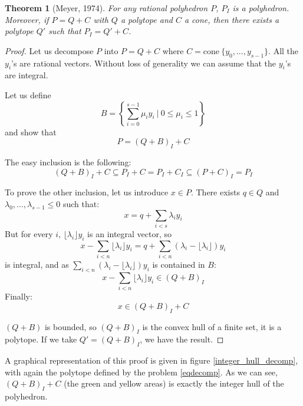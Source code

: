 \documentclass{article}
\newcommand{\cone}{\mathrm{cone}}
\newtheorem{theorem}{Theorem}
\begin{document}
\begin{theorem}[Meyer, 1974]
\label{meyer theorem}
  For any rational polyhedron $P$, $P_I$ is a polyhedron. Moreover, if
  $P = Q + C$ with $Q$ a polytope and $C$ a cone, then there exists a polytope
  $Q'$ such that $P_I = Q' + C$.
\end{theorem}
\begin{proof}
  Let us decompose $P$ into $P = Q + C$ where
  $C = \cone~\{y_0, ..., y_{s-1}\}$. All the $y_i$'s are rational vectors.
  Without loss of generality we can assume that the $y_i$'s are integral.

  Let us define
  $$B = \left\{\sum_{i=0}^{s-1} \mu_i y_i~|~
               0 \leqslant \mu_i \leqslant 1\right\}$$
  and show that $$P = (Q + B)_I + C$$

  The easy inclusion is the following:
  $$(Q + B)_I + C \subseteq P_I + C = P_I + C_I \subseteq (P + C)_I = P_I$$

  To prove the other inclusion, let us introduce $x \in P$.
  There exists $q \in Q$ and $\lambda_0, ..., \lambda_{s-1}
  \leqslant 0$ such that: $$x = q + \sum_{i < s} \lambda_i y_i$$ But for every
  $i$, $\lfloor \lambda_i \rfloor y_i$ is an integral vector, so
  $$x - \sum_{i<n} \lfloor \lambda_i \rfloor y_i=
      q + \sum_{i<n} (\lambda_i - \lfloor \lambda_i \rfloor) y_i$$
  is integral, and as $\sum_{i<n} (\lambda_i - \lfloor \lambda_i \rfloor) y_i$
  is contained in $B$:
  $$x - \sum_{i<n} \lfloor \lambda_i \rfloor y_i \in (Q + B)_I$$
  Finally: $$x \in (Q + B)_I + C$$

  $(Q + B)$ is bounded, so $(Q + B)_I$ is the convex hull of a finite set, it is
  a polytope. If we take $Q' = (Q + B)_I$, we have the result.
\end{proof}

A graphical representation of this proof is given in figure
\ref{integer_hull_decomp}, with again the polytope defined by the problem
\ref{eqdecomp}. As we can see, $(Q + B)_I + C$ (the
green and yellow areas) is exactly the integer hull of the polyhedron.
\end{document}
